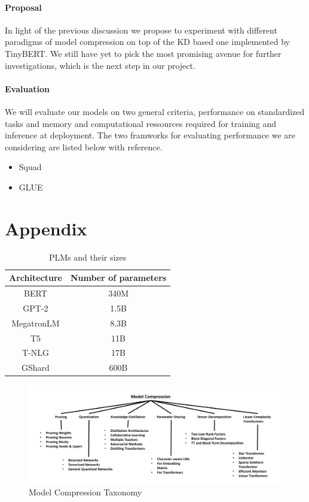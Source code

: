 \documentclass{article}
\begin{document}
\paragraph{Proposal} In light of the previous discussion we propose to
experiment with different paradigms of model compression on top of the KD based
one implemented by TinyBERT. We still have yet to pick the most promising avenue
for further investigations, which is the next step in our project.


\paragraph{Evaluation} We will evaluate our models on two general criteria,
performance on standardized tasks and memory and computational ressources required
for training and inference at deployment. The two framworks for evaluating performance
we are considering are listed below with reference.
\begin{itemize}
  \item Squad\cite{squad}
  \item GLUE\cite{glue}
\end{itemize}


\clearpage



\clearpage
\appendix
\section{Appendix}

\begin{table}[htbp]
\centering
  \begin{tabular}{cc}
    \toprule
    Architecture & Number of parameters\\
    \midrule
    BERT & 340M\\
    GPT-2 & 1.5B\\
    MegatronLM & 8.3B\\
    T5 & 11B\\
    T-NLG & 17B\\
    GShard & 600B\\
    \bottomrule
  \end{tabular}
  \caption{PLMs and their sizes\cite{gupta2020compression}}\label{plmsize}
\end{table}

\begin{figure}[h]
  \centering
  \includegraphics[width=\textwidth]{illustrations/modelcompressiontaxonomy}
  \caption{Model Compression Taxonomy\cite{gupta2020compression}}\label{fig:modelcompression}
\end{figure}
\end{document}
